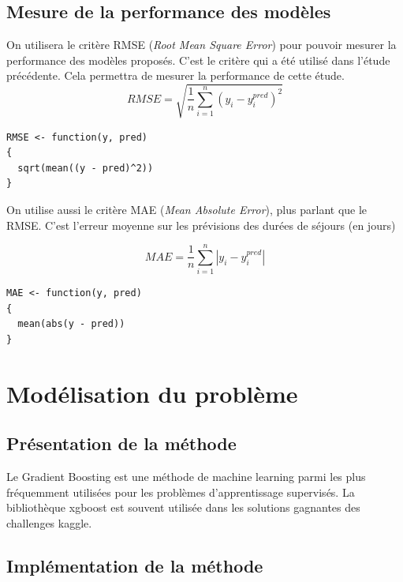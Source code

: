 \documentclass[a4paper,11pt]{article}
\begin{document}
\subsection{Mesure de la performance des modèles}
On utilisera le critère RMSE (\textit{Root Mean Square Error}) pour pouvoir mesurer la performance des modèles proposés. C'est le critère qui a été utilisé dans l'étude précédente. Cela permettra de mesurer la performance de cette étude.
\[
RMSE = \sqrt{\frac{1}{n}\sum_{i=1}^{n}(y_{i}-y_{i}^{pred})^{2}}
\]
\begin{lstlisting}
RMSE <- function(y, pred)
{
  sqrt(mean((y - pred)^2))
}
\end{lstlisting}

On utilise aussi le critère MAE (\textit{Mean Absolute Error}), plus parlant que le RMSE. C'est l'erreur moyenne sur les prévisions des durées de séjours (en jours)

\[
MAE = \frac{1}{n}\sum_{i=1}^{n}|y_{i}-y_{i}^{pred}|
\]

\begin{lstlisting}
MAE <- function(y, pred)
{
  mean(abs(y - pred))
}
\end{lstlisting}

\section{Modélisation du problème}
\subsection{Présentation de la méthode}
Le Gradient Boosting est une méthode de machine learning parmi les plus fréquemment utilisées pour les problèmes d'apprentissage supervisés. La bibliothèque xgboost est souvent utilisée dans les solutions gagnantes des challenges kaggle.
\subsection{Implémentation de la méthode}
\end{document}

